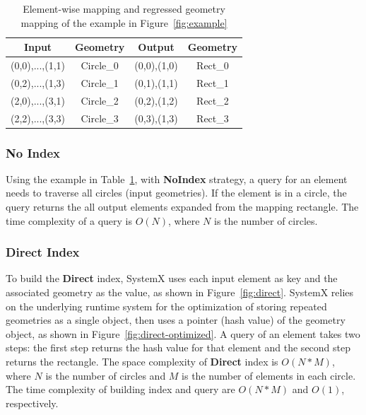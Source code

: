 \documentclass{sig-alternate}
\begin{document}
\begin{table}[h]
\begin{center}
    \caption{Element-wise mapping and regressed geometry mapping of the example in Figure~\ref{fig:example}}
    \begin{scriptsize}
    \begin{tabular}{ | c | c | c | c |}
    \hline
    Input & Geometry & Output & Geometry \\ \hline \hline
    (0,0),...,(1,1) & Circle\_0 & (0,0),(1,0) & Rect\_0 \\ \hline
    (0,2),...,(1,3) & Circle\_1 & (0,1),(1,1) & Rect\_1 \\ \hline
    (2,0),...,(3,1) & Circle\_2 & (0,2),(1,2) & Rect\_2 \\ \hline
    (2,2),...,(3,3) & Circle\_3 & (0,3),(1,3) & Rect\_3 \\ \hline
    \end{tabular}
    \end{scriptsize}
    \label{tb:example}
\end{center}   
\end{table} 

\subsubsection{No Index}
Using the example in Table~\ref{tb:example}, with {\bf NoIndex} strategy, a query for an element needs to traverse all circles (input geometries).
If the element is in a circle, the query returns the all output elements expanded from the mapping rectangle.
The time complexity of a query is $O(N)$, where $N$ is the number of circles. 

\subsubsection{Direct Index}
To build the {\bf Direct} index, SystemX uses each input element as key and the associated geometry as the value, as shown in Figure~\ref{fig:direct}.
SystemX relies on the underlying runtime system for the optimization of storing repeated geometries as a single object,
then uses a pointer (hash value) of the geometry object, as shown in Figure~\ref{fig:direct-optimized}.
A query of an element takes two steps: the first step returns the hash value for that element and the second step returns the rectangle. 
The space complexity of {\bf Direct} index is $O(N*M)$, where $N$ is the number of circles and $M$ is the number of elements in each circle.
The time complexity of building index and query are $O(N*M)$ and $O(1)$, respectively.
\end{document}
